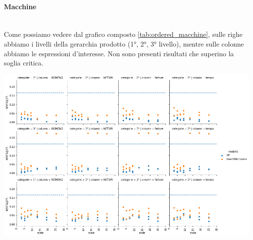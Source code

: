 \paragraph{Macchine}\mbox{} \\
Come possiamo vedere dal grafico composto \ref{tab:ordered_macchine}, sulle righe abbiamo i livelli della gerarchia prodotto (1°, 2°, 3° livello), mentre sulle colonne abbiamo le espressioni d'interesse. 
Non sono presenti risultati che superino la soglia critica.
\begin{center}
    \includegraphics[width=16cm]{figures/risultati_ordered_categoria_macchine.png}
    \label{tab:ordered_macchine}
\end{center}

